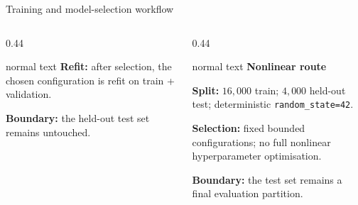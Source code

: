 \documentclass[aspectratio=169,10pt]{beamer}
\begin{document}
\begin{frame}[t]{Training and model-selection workflow}
\begin{columns}[T,totalwidth=0.94\textwidth]
\begin{column}{0.44\textwidth}
\begin{beamercolorbox}[wd=\linewidth,sep=0.56em]{normal text}
        \vspace{0.08cm}
        \textbf{Refit:} after selection, the chosen configuration is refit on train + validation.\par
        \vspace{0.08cm}
        \textbf{Boundary:} the held-out test set remains untouched.
      \end{beamercolorbox}
    \end{column}
    \begin{column}{0.44\textwidth}
      \begin{beamercolorbox}[wd=\linewidth,sep=0.56em]{normal text}
        \small\textbf{\color{GVCouplingOrange}Nonlinear route}\par
        \vspace{0.08cm}\scriptsize
        \textbf{Split:} \(16{,}000\) train; \(4{,}000\) held-out test; deterministic \texttt{random\_state=42}.\par
        \vspace{0.10cm}
        \textbf{Selection:} fixed bounded configurations; no full nonlinear hyperparameter optimisation.\par
        \vspace{0.10cm}
        \textbf{Boundary:} the test set remains a final evaluation partition.
      \end{beamercolorbox}
    \end{column}
  \end{columns}
\end{frame}
\end{document}
